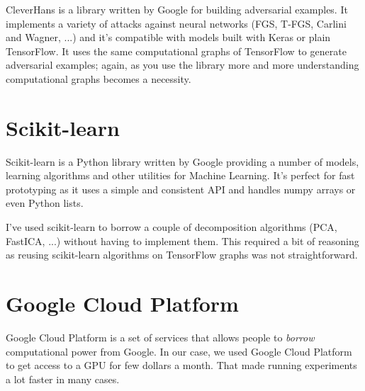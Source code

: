 CleverHans is a library written by Google for building adversarial
examples. It implements a variety of attacks against neural networks
(FGS, T-FGS, Carlini and Wagner, ...) and it's compatible with models
built with Keras or plain TensorFlow. It uses the same computational
graphs of TensorFlow to generate adversarial examples; again, as you
use the library more and more understanding computational graphs
becomes a necessity.

\section{Scikit-learn}
\label{sec:sklearn}

Scikit-learn is a Python library written by Google providing a number
of models, learning algorithms and other utilities for Machine
Learning. It's perfect for fast prototyping as it uses a simple and
consistent API and handles numpy arrays or even Python lists.

I've used scikit-learn to borrow a couple of decomposition algorithms
(PCA, FastICA, ...) without having to implement them. This required a
bit of reasoning as reusing scikit-learn algorithms on TensorFlow
graphs was not straightforward.

\section{Google Cloud Platform}
\label{sec:google-cloud-platform}

Google Cloud Platform is a set of services that allows people to
\emph{borrow} computational power from Google. In our case, we used
Google Cloud Platform to get access to a GPU for few dollars a month.
That made running experiments a lot faster in many cases.
